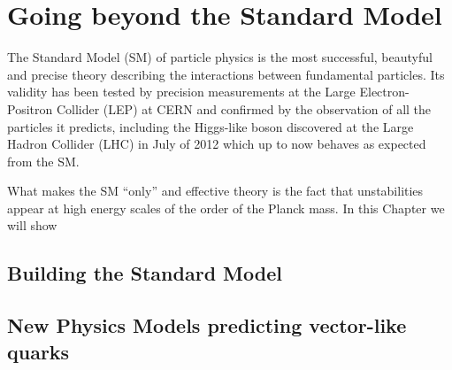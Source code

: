 \clearpage{\pagestyle{empty}\cleardoublepage}

\chapter{Going beyond the Standard Model}\label{chap:bsm}

The Standard Model (SM) of particle physics is the most successful, beautyful and precise theory describing the interactions
between fundamental particles. Its validity has been tested by precision measurements at the Large Electron-Positron Collider (LEP)
at CERN and confirmed by the observation of all the particles it predicts, including the Higgs-like boson discovered at the
Large Hadron Collider (LHC) in July of 2012 which up to now behaves as expected from the SM.

What makes the SM ``only'' and effective theory is the fact that unstabilities appear at high energy scales of the order of the
Planck mass. In this Chapter we will show 

\section{Building the Standard Model}


\section{New Physics Models predicting vector-like quarks}
\cite{AguilarSaavedra:2009es,Martin:2009bg}
